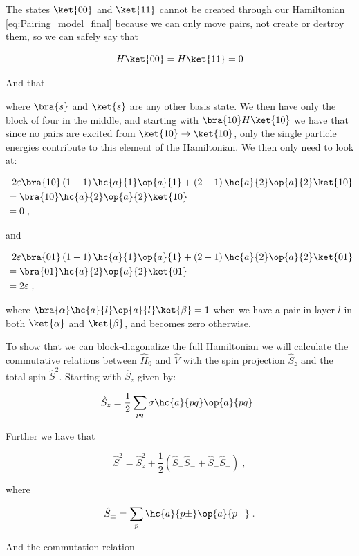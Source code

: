 The states $\ket{00}$ and $\ket{11}$ cannot be created through our Hamiltonian \ref{eq:Pairing_model_final} because we can only move pairs, not create or destroy them, so we can safely say that 

$$ H \ket{00} = H\ket{11} = 0$$

And that

where $\bra{s}$ and $\ket{s}$ are any other basis state. We then have only the block of four in the middle, and starting with $\bra{10}H\ket{10}$ we have that since no pairs are excited from $\ket{10} \rightarrow \ket{10}$, only the single particle energies contribute to this element of the Hamiltonian. We then only need to look at:

\begin{align*}
 &\; \; 2\varepsilon\bra{10}  \left (1 - 1 \right) \hc{a}{1}\op{a}{1} + \left (2 - 1 \right) \hc{a}{2}\op{a}{2} \ket{10} \\
 &= \bra{10} \hc{a}{2}\op{a}{2} \ket{10} \\
 &= 0
 \; ,
\end{align*}

and

\begin{align*}
 &\; \; 2\varepsilon\bra{01}  \left (1 - 1 \right) \hc{a}{1}\op{a}{1} + \left (2 - 1 \right) \hc{a}{2}\op{a}{2} \ket{01} \\
 &= \bra{01} \hc{a}{2}\op{a}{2} \ket{01} \\
 &= 2\varepsilon
 \; ,
\end{align*}

where $\bra{\alpha} \hc{a}{l}\op{a}{l} \ket{\beta} = 1$ when we have a pair in layer $l$ in both $\ket{\alpha}$ and $\ket{\beta}$, and becomes zero otherwise. 

To show that we can block-diagonalize the full Hamiltonian we will calculate the commutative relations between $\hat{H}_0$ and $\hat{V}$ with the spin projection $\hat{S}_z$ and the total spin $\hat{S}^2$. Starting with $\hat{S}_z$ given by:

\begin{equation}
  \hat{S}_z = \frac{1}{2}\sum_{pq} \sigma \hc{a}{pq}\op{a}{pq}\; .
  \label{eq:s_z}
\end{equation}

Further we have that

\begin{equation}
  \hat{S}^2 = \hat{S}_z^2 + \frac{1}{2} \left(\hat{S}_+\hat{S}_- + \hat{S}_-\hat{S}_+\right) \; ,
  \label{eq:s_2}
\end{equation}

where

\begin{equation}
  \hat{S}_{\pm} = \sum_p \hc{a}{p\pm}\op{a}{p\mp} \; . 
  \label{eq:s_pm}
\end{equation}

And the commutation relation
